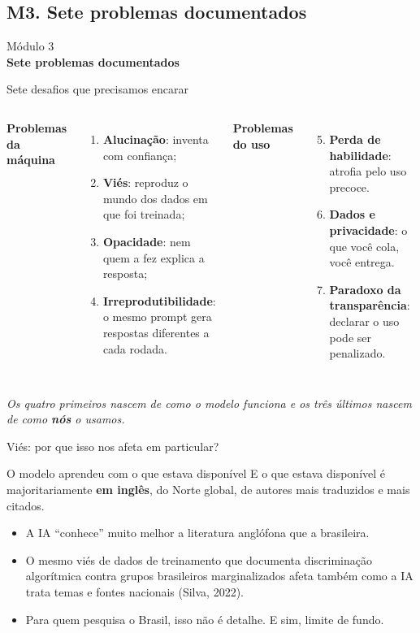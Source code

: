 \documentclass[11pt,aspectratio=169,t]{beamer}
\newcommand{\transicao}[2]{%
  \begin{frame}[plain]
    \centering
    \vspace*{2.2cm}
    {\large\color{cinzaescuro} #1}\\[0.8cm]
    {\Large\color{azulUNI}\textbf{#2}}
  \end{frame}}
\begin{document}
\subsection{M3. Sete problemas documentados}
\transicao{Módulo 3}{Sete problemas documentados}
\begin{frame}{Sete desafios que precisamos encarar}
  \begin{columns}[t]
    \textbf{\color{laranjaDestaque}Problemas da máquina}
    \begin{enumerate}
      \item \textbf{Alucinação}: inventa com confiança;
      \item \textbf{Viés}: reproduz o mundo dos dados em que foi treinada;
      \item \textbf{Opacidade}: nem quem a fez explica a resposta;
      \item \textbf{Irreprodutibilidade}: o mesmo prompt gera respostas diferentes a cada rodada.
    \end{enumerate}
    \textbf{\color{laranjaDestaque}Problemas do uso}
    \begin{enumerate}
      \setcounter{enumi}{4}
      \item \textbf{Perda de habilidade}: atrofia pelo uso precoce.
      \item \textbf{Dados e privacidade}: o que você cola, você entrega.
      \item \textbf{Paradoxo da transparência}: declarar o uso pode ser penalizado.
    \end{enumerate}
  \end{columns}
  \vfill
  \small\textit{Os quatro primeiros nascem de como o modelo funciona e os três últimos nascem de como \textbf{nós} o usamos.}
\end{frame}
\begin{frame}{Viés: por que isso nos afeta em particular?}
  \begin{block}{O modelo aprendeu com o que estava disponível}
    E o que estava disponível é majoritariamente \textbf{em inglês}, do Norte global, de autores mais traduzidos e mais citados.
  \end{block}
  \pause
  \vfill
  \begin{itemize}
    \item A IA ``conhece'' muito melhor a literatura anglófona que a brasileira.
    \item O mesmo viés de dados de treinamento que documenta discriminação algorítmica contra grupos brasileiros marginalizados afeta também como a IA trata temas e fontes nacionais (Silva, 2022).
    \pause
    \item \alert{Para quem pesquisa o Brasil, isso não é detalhe. E sim, limite de fundo.}
  \end{itemize}
\end{frame}
\end{document}

